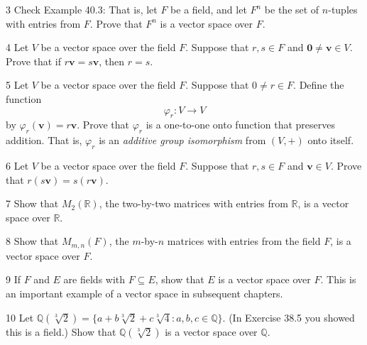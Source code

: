\begin{problem}{3}
    Check Example 40.3: That is, let $F$ be a field, and let $F^n$ be the set of
    $n$-tuples with entries from $F$. Prove that $F^n$ is a vector space over $F$.
\end{problem}
\unsolved

\begin{problem}{4}
    Let $V$ be a vector space over the field $F$. Suppose that $r, s \in F$ and
    $\mathbf{0} \neq \mathbf{v} \in V$. Prove that if $r\mathbf{v} = s\mathbf{v}$, then
    $r = s$.
\end{problem}
\unsolved

\begin{problem}{5}
    Let $V$ be a vector space over the field $F$. Suppose that $0 \neq r \in F$. Define
    the function
    \[\varphi_r : V \to V\]
    by $\varphi_r(\mathbf{v}) = r\mathbf{v}$. Prove that $\varphi_r$ is a one-to-one onto
    function that preserves addition. That is, $\varphi_r$ is an \emph{additive group
    isomorphism} from $(V, +)$ onto itself.
\end{problem}
\unsolved

\begin{problem}{6}
    Let $V$ be a vector space over the field $F$. Suppose that $r, s \in F$ and
    $\mathbf{v} \in V$. Prove that $r(s\mathbf{v}) = s(r\mathbf{v})$.
\end{problem}
\unsolved

\begin{problem}{7}
    Show that $M_2(\mathbb{R})$, the two-by-two matrices with entries from $\mathbb{R}$, is
    a vector space over $\mathbb{R}$.
\end{problem}
\unsolved

\begin{problem}{8}
    Show that $M_{m,n}(F)$, the $m$-by-$n$ matrices with entries from the field $F$, is a
    vector space over $F$.
\end{problem}
\unsolved

\begin{problem}{9}
    If $F$ and $E$ are fields with $F \subseteq E$, show that $E$ is a vector space over
    $F$. This is an important example of a vector space in subsequent chapters.
\end{problem}
\unsolved

\begin{problem}{10}
    Let
    $\mathbb{Q}(\sqrt[3]{2}) = \{a + b\sqrt[3]{2} + c\sqrt[3]{4} : a, b, c \in \mathbb{Q}\}$.
    (In Exercise 38.5 you showed this is a field.) Show that $\mathbb{Q}(\sqrt[3]{2})$ is a
    vector space over $\mathbb{Q}$.
\end{problem}
\unsolved


